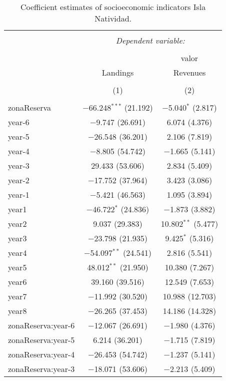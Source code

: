 
\begin{table}[!htbp] \centering 
  \caption{Coefficient estimates of socioeconomic indicators Isla Natividad.} 
  \label{} 
\small 
\begin{tabular}{@{\extracolsep{1pt}}lcc} 
\\[-1.8ex]\hline 
\hline \\[-1.8ex] 
 & \multicolumn{2}{c}{\textit{Dependent variable:}} \\ 
\cline{2-3} 
\\[-1.8ex] &  & valor \\ 
 & Landings & Revenues \\ 
\\[-1.8ex] & (1) & (2)\\ 
\hline \\[-1.8ex] 
 zonaReserva & $-$66.248$^{***}$ (21.192) & $-$5.040$^{*}$ (2.817) \\ 
  year-6 & $-$9.747 (26.691) & 6.074 (4.376) \\ 
  year-5 & $-$26.548 (36.201) & 2.106 (7.819) \\ 
  year-4 & $-$8.805 (54.742) & $-$1.665 (5.141) \\ 
  year-3 & 29.433 (53.606) & 2.834 (5.409) \\ 
  year-2 & $-$17.752 (37.964) & 3.423 (3.086) \\ 
  year-1 & $-$5.421 (46.563) & 1.095 (3.894) \\ 
  year1 & $-$46.722$^{*}$ (24.836) & $-$1.873 (3.882) \\ 
  year2 & 9.037 (29.383) & 10.802$^{**}$ (5.477) \\ 
  year3 & $-$23.798 (21.935) & 9.425$^{*}$ (5.316) \\ 
  year4 & $-$54.097$^{**}$ (24.541) & 2.816 (5.541) \\ 
  year5 & 48.012$^{**}$ (21.950) & 10.380 (7.267) \\ 
  year6 & 39.160 (39.516) & 12.549 (7.653) \\ 
  year7 & $-$11.992 (30.520) & 10.988 (12.703) \\ 
  year8 & $-$26.265 (37.453) & 14.186 (14.328) \\ 
  zonaReserva:year-6 & $-$12.067 (26.691) & $-$1.980 (4.376) \\ 
  zonaReserva:year-5 & 6.214 (36.201) & $-$1.715 (7.819) \\ 
  zonaReserva:year-4 & $-$26.453 (54.742) & $-$1.237 (5.141) \\ 
  zonaReserva:year-3 & $-$18.071 (53.606) & $-$2.213 (5.409) \\ 

\end{tabular}
\end{table}
